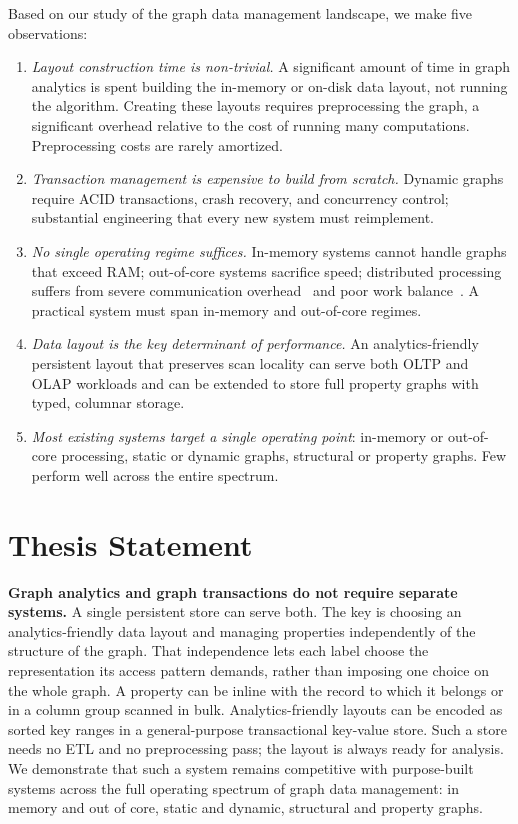 Based on our study of the graph data management landscape, we make five observations:
\begin{enumerate}
  \item \textit{Layout construction time is non-trivial.} A significant amount of time in graph analytics is spent building the in-memory or on-disk data layout, not running the algorithm. Creating these layouts requires preprocessing the graph, a significant overhead relative to the cost of running many computations. Preprocessing costs are rarely amortized.
  \item \textit{Transaction management is expensive to build from scratch.} Dynamic graphs require ACID transactions, crash recovery, and concurrency control; substantial engineering that every new system must reimplement.
  \item \textit{No single operating regime suffices.} In-memory systems cannot handle graphs that exceed RAM; out-of-core systems sacrifice speed; distributed processing suffers from severe communication overhead~\cite{mcsherry2015scalability,beamer2016understanding} and poor work balance~\cite{hajidehi2023cuttana}. A practical system must span in-memory and out-of-core regimes.
  \item \textit{Data layout is the key determinant of performance.} An analytics-friendly persistent layout that preserves scan locality can serve both OLTP and OLAP workloads and can be extended to store full property graphs with typed, columnar storage.
  \item \textit{Most existing systems target a single operating point}: in-memory or out-of-core processing, static or dynamic graphs, structural or property graphs. Few perform well across the entire spectrum.
\end{enumerate}

\section{Thesis Statement}
\textbf{Graph analytics and graph transactions do not require separate systems.}
A single persistent store can serve both.
The key is choosing an analytics-friendly data layout and managing properties independently of the structure of the graph.
That independence lets each label choose the representation its access pattern demands, rather than imposing one choice on the whole graph.
A property can be inline with the record to which it belongs or in a column group scanned in bulk.
Analytics-friendly layouts can be encoded as sorted key ranges in a general-purpose transactional key-value store.
Such a store needs no ETL and no preprocessing pass; the layout is always ready for analysis.
We demonstrate that such a system remains competitive with purpose-built systems across the full operating spectrum of graph data management: in memory and out of core, static and dynamic, structural and property graphs.

